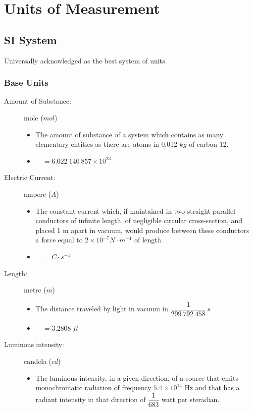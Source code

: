 \documentclass[]{report}
\newcommand{\items}{\item\ \ }
\begin{document}
\chapter{Units of Measurement}
            
            
\section{SI System}	
Universally acknowledged as the best system of units.

\subsection{Base Units}
\begin{description}

\item[Amount of Substance:] mole ($mol$)
\begin{itemize}
\item The amount of substance of a system which contains as many elementary entities as there are atoms in 0.012 $kg$ of carbon-12.
\items $= 6.022\ 140\ 857 \times 10^{23}$
\end{itemize}			

\item[Electric Current:] ampere ($A$)
\begin{itemize}
\item The constant current which, if maintained in two straight parallel conductors of infinite length, of negligible circular cross-section, and placed 1 m apart in vacuum, would produce between these conductors a force equal to $2×10^{-7} N\cdot m^{-1}$ of length.
\items $= C\cdot s^{-1} $
\end{itemize}			

\item[Length:] metre ($m$)
\begin{itemize}
\item The distance traveled by light in vacuum in $\dfrac{1}{299\ 792\ 458}\ s$
\items $=3.2808\ ft$
\end{itemize}

\item[Luminous intensity:] candela ($cd$)
\begin{itemize}
\item The luminous intensity, in a given direction, of a source that emits monochromatic radiation of frequency $5.4 \times 10^{14}$ Hz and that has a radiant intensity in that direction of $\dfrac{1}{683}$ watt per steradian.
\end{itemize}


\end{description}
\end{document}
